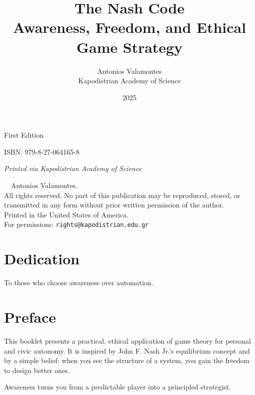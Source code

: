 \documentclass[12pt,twoside]{book}
\title{\Huge\bfseries The Nash Code\\[4pt]
\Large Awareness, Freedom, and Ethical Game Strategy}
\author{\large Antonios Valamontes\\[2pt]
\small Kapodistrian Academy of Science}
\date{\small 2025}
\newcommand{\ISBN}{ISBN: 979-8-27-064165-8}
\newcommand{\Edition}{First Edition}
\newcommand{\PublisherNote}{\small\textit{Printed via Kapodistrian Academy of Science}}
\begin{document}

\frontmatter
\begin{titlepage}
  \centering
  {\vspace*{2cm}\maketitle}
  \vfill
  {\Edition\par}
  {\ISBN\par}
  \vspace{0.5\baselineskip}
  {\PublisherNote\par}
\end{titlepage}

\thispagestyle{empty}
\vspace*{\fill}
\noindent\textcopyright\ \the\year\ Antonios Valamontes.\\
All rights reserved. No part of this publication may be reproduced, stored, or transmitted in any form without prior written permission of the author.\\[6pt]
\noindent Printed in the United States of America.\\
\noindent For permissions: \texttt{rights@kapodistrian.edu.gr}
\vspace*{\fill}
\clearpage

\chapter*{Dedication}
To those who choose awareness over automation.
\clearpage

\tableofcontents
\clearpage

\chapter*{Preface}
This booklet presents a practical, ethical application of game theory for personal and civic autonomy. 
It is inspired by John F. Nash Jr.'s equilibrium concept and by a simple belief: when you see the structure of a system, you gain the freedom to design better ones. \\

\begin{keyidea}
Awareness turns you from a predictable player into a principled strategist.
\end{keyidea}
\clearpage
\end{document}
